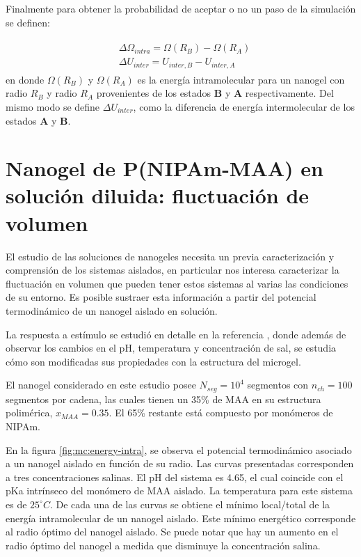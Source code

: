 Finalmente para obtener la probabilidad de aceptar o no un paso de la simulaci\'on se definen:
	
	\begin{align}
		\begin{aligned}
			& \Delta \Omega_{intra} = \Omega(R_B) - \Omega(R_A) \\
			& \Delta U_{inter} = U_{inter,B} - U_{inter,A}
		\end{aligned}
	\end{align}
	\noindent en donde $\Omega(R_B)$ y $\Omega(R_A)$ es la energ\'ia intramolecular para un nanogel con radio $R_B$ y radio $R_A$ provenientes de los estados \textbf{B} y \textbf{A} respectivamente. Del mismo modo se define $\Delta U_{inter}$, como la diferencia de energ\'ia intermolecular de los estados \textbf{A} y \textbf{B}.
	

	
	\section{Nanogel de P(NIPAm-MAA) en soluci\'on diluida: fluctuaci\'on de volumen} \label{sec:fluctuacion-volumen}
	
	El estudio de las soluciones de nanogeles necesita un previa caracterizaci\'on y comprensi\'on de los sistemas aislados, en particular nos interesa caracterizar la fluctuaci\'on en volumen que pueden tener estos sistemas al varias las condiciones de su entorno.  Es posible sustraer esta informaci\'on a partir del potencial termodin\'amico de un nanogel aislado en soluci\'on.
	
	La respuesta a est\'imulo se estudi\'o en detalle en la referencia \cite{perez2021thermodynamic}, donde adem\'as de observar los cambios en el pH, temperatura y concentraci\'on de sal, se estudia c\'omo son modificadas sus propiedades con la estructura del microgel.
	
	El nanogel considerado en este estudio posee $N_{seg} = 10^4$ segmentos con $n_{ch} = 100$ segmentos por cadena, las cuales tienen un 35\% de MAA en su estructura polim\'erica, $x_{MAA} = 0.35$. El 65\% restante est\'a compuesto por mon\'omeros de NIPAm.
	
	En la figura \ref{fig:mc:energy-intra}, se observa el potencial termodin\'amico asociado a un nanogel aislado en funci\'on de su radio. Las curvas presentadas corresponden a tres concentraciones salinas. El pH del sistema es 4.65, el cual coincide con el pKa intr\'inseco del mon\'omero de MAA aislado. La temperatura para este sistema es de $25 ^\circ C$. De cada una de las curvas se obtiene el m\'inimo local/total de la energ\'ia intramolecular de un nanogel aislado. Este m\'inimo energ\'etico corresponde al radio \'optimo del nanogel aislado. Se puede notar que hay un aumento en el radio \'optimo del nanogel a medida que disminuye la concentraci\'on salina.
	
